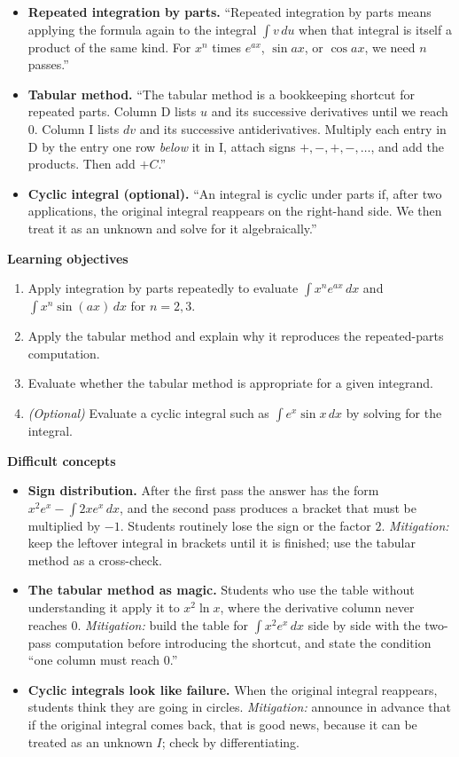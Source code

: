\documentclass[11pt]{article}
\begin{document}
\begin{defbox}
\begin{itemize}
\item \textbf{Repeated integration by parts.} ``Repeated integration by parts means applying the formula again to the integral $\int v\,du$ when that integral is itself a product of the same kind. For $x^n$ times $e^{ax}$, $\sin ax$, or $\cos ax$, we need $n$ passes.''
\item \textbf{Tabular method.} ``The tabular method is a bookkeeping shortcut for repeated parts. Column D lists $u$ and its successive derivatives until we reach $0$. Column I lists $dv$ and its successive antiderivatives. Multiply each entry in D by the entry one row \emph{below} it in I, attach signs $+,-,+,-,\dots$, and add the products. Then add $+C$.''
\item \textbf{Cyclic integral (optional).} ``An integral is cyclic under parts if, after two applications, the original integral reappears on the right-hand side. We then treat it as an unknown and solve for it algebraically.''
\end{itemize}
\end{defbox}

\textbf{Learning objectives}
\begin{enumerate}
\item Apply integration by parts repeatedly to evaluate $\int x^n e^{ax}\,dx$ and $\int x^n\sin(ax)\,dx$ for $n=2,3$.
\item Apply the tabular method and explain why it reproduces the repeated-parts computation.
\item Evaluate whether the tabular method is appropriate for a given integrand.
\item \emph{(Optional)} Evaluate a cyclic integral such as $\int e^x\sin x\,dx$ by solving for the integral.
\end{enumerate}

\textbf{Difficult concepts}
\begin{itemize}
\item \textbf{Sign distribution.} After the first pass the answer has the form $x^2e^x - \int 2xe^x\,dx$, and the second pass produces a bracket that must be multiplied by $-1$. Students routinely lose the sign or the factor $2$. \emph{Mitigation:} keep the leftover integral in brackets until it is finished; use the tabular method as a cross-check.
\item \textbf{The tabular method as magic.} Students who use the table without understanding it apply it to $x^2\ln x$, where the derivative column never reaches $0$. \emph{Mitigation:} build the table for $\int x^2e^x\,dx$ side by side with the two-pass computation before introducing the shortcut, and state the condition ``one column must reach $0$.''
\item \textbf{Cyclic integrals look like failure.} When the original integral reappears, students think they are going in circles. \emph{Mitigation:} announce in advance that if the original integral comes back, that is good news, because it can be treated as an unknown $I$; check by differentiating.
\end{itemize}
\end{document}
